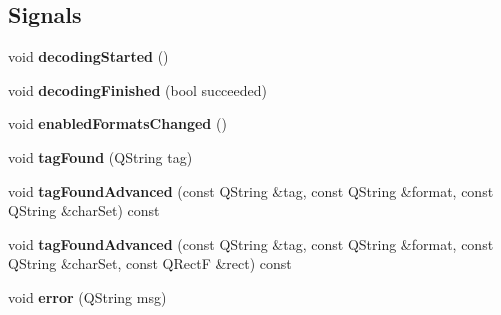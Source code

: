 \subsection*{Signals}
\begin{DoxyCompactItemize}
\item 
\mbox{\label{class_q_z_xing_ad151a4c0ead10bb4241dfcc8c3e18e2c}} 
void {\bfseries decoding\+Started} ()
\item 
\mbox{\label{class_q_z_xing_ab03a87890271917ea28d0364c4da2f28}} 
void {\bfseries decoding\+Finished} (bool succeeded)
\item 
\mbox{\label{class_q_z_xing_a696bd59635536b3783e5f375202b6aab}} 
void {\bfseries enabled\+Formats\+Changed} ()
\item 
\mbox{\label{class_q_z_xing_abf25c39a79a371173312bd497eac98a6}} 
void {\bfseries tag\+Found} (Q\+String tag)
\item 
\mbox{\label{class_q_z_xing_aa6c6053a43a0ab92fa3cdfeb0a4821d9}} 
void {\bfseries tag\+Found\+Advanced} (const Q\+String \&tag, const Q\+String \&format, const Q\+String \&char\+Set) const
\item 
\mbox{\label{class_q_z_xing_a473a901632018b882c3a3e7b0cd3bffe}} 
void {\bfseries tag\+Found\+Advanced} (const Q\+String \&tag, const Q\+String \&format, const Q\+String \&char\+Set, const Q\+RectF \&rect) const
\item 
\mbox{\label{class_q_z_xing_abed4b445f501ce53960a7b9c15010e8b}} 
void {\bfseries error} (Q\+String msg)
\end{DoxyCompactItemize}
